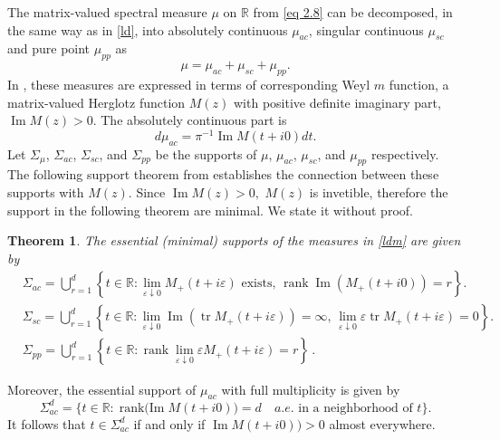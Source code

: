 \documentclass[reqno]{amsart}
\numberwithin{equation}{section}
\newcommand{\R}{\mathbb{R}}
\newtheorem{theorem}{Theorem}[section]
\begin{document}
The matrix-valued spectral measure $\mu$ on $\R$ from \eqref{eq 2.8} can be decomposed, in the same way as in \eqref{ld}, into absolutely continuous $\mu_{ac}$, singular continuous $\mu_{sc}$  and pure point $\mu_{pp}$ as 
\begin{equation} \label{ldm}
\mu = \mu_{ac} + \mu_{sc} +\mu_{pp}.
\end{equation} 
In \cite{FG}, these measures are expressed in terms of corresponding Weyl $m$ function, a  matrix-valued Herglotz function $M(z)$ with positive definite imaginary part, $ \operatorname{Im} M(z) >0 $.  The absolutely continuous part is \begin{equation*}
    d\mu_{ac} = \pi^{-1} \operatorname{ Im} M(t +i 0 )dt . 
    \end{equation*} Let   $\Sigma_{\mu}$, $\Sigma_{ac}$, $ \Sigma_{sc}$, and $\Sigma_{pp}$ be the supports of $\mu$, $\mu_{ac}$, $\mu_{sc}$, and $\mu_{pp}$ respectively.  The following support theorem from \cite{FG} establishes the connection between these supports with  $ M(z) .$ Since $\operatorname{Im} M(z) >0, $ $M(z)$ is invetible, therefore the support in the following theorem are minimal. We state it without proof.
\begin{theorem} \cite{FG} The essential (minimal) supports of the measures in \eqref{ldm} are given by \begin{align*}
			& \Sigma_{ac}  = \bigcup_{r=1}^d \left\{t\in\R : \lim_{\varepsilon\downarrow 0} M_+(t + i\varepsilon)\textrm{ exists, } \operatorname{rank }\operatorname{Im}(M_+(t + i0)) = r \right\} .\\ &
			\Sigma_{sc}   = \bigcup_{r=1}^d \left\{t\in\R : \lim_{\varepsilon\downarrow 0} \operatorname{Im}(\operatorname{tr } M_+(t + i\varepsilon))=\infty,\,\lim_{\varepsilon\downarrow 0}\varepsilon\operatorname{tr }M_+(t + i\varepsilon)=0 \right\}. \\ &	 
			\Sigma_{pp}   = \bigcup_{r=1}^d \left\{t\in\R : \operatorname{rank }\lim_{\varepsilon\downarrow 0}\varepsilon M_+(t + i\varepsilon) = r \right\}\,.
		\end{align*}
	 
\end{theorem}
  Moreover, the essential support of $\mu_{ac}$  with full multiplicity is given by
\[ 
\Sigma_{ac}^d = \{ t \in \R :  \operatorname{rank ( Im} M(t +i0) ) = d \quad a. e. \text{  in a neighborhood of }  t \}.
\] It follows that $t \in \Sigma_{ac}^d $ if and only if $ \operatorname{ Im}M(t +i0) ) >0 $ almost everywhere.
\end{document}
